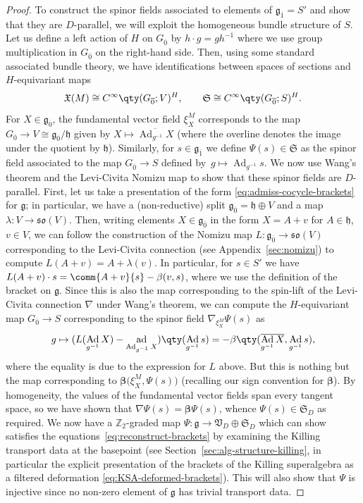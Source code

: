\documentclass[pdftex]{sigma}
\numberwithin{equation}{section}
\newcommand{\fg}{\mathfrak{g}}
\newcommand{\fh}{\mathfrak{h}}
\newcommand{\fso}{\mathfrak{so}}
\newcommand{\fX}{\mathfrak{X}}
\newcommand{\fS}{\mathfrak{S}}
\newcommand{\fV}{\mathfrak{V}}
\newcommand{\ZZ}{\mathbb{Z}}
\newcommand{\1}{\mathbbm{1}}
\DeclareMathOperator{\Ad}{Ad}
\DeclareMathOperator{\ad}{ad}
\begin{document}
\begin{proof}
	To construct the spinor fields associated to elements of $\fg_{\overline 1}=S'$ and show that they are $D$-parallel, we will exploit the homogeneous bundle structure of $S$. Let us define a left action of $H$ on $G_{\overline 0}$ by $h\cdot g=gh^{-1}$ where we use group multiplication in $G_{\overline 0}$ on the right-hand side. Then, using some standard associated bundle theory, we have identifications between spaces of sections and $H$-equivariant maps
	\[
		\fX(M) \cong C^\infty\qty(G_{\overline 0};V)^H,\qquad
		\fS \cong C^\infty\qty(G_{\overline 0};S)^H.
	\]
	For $X\in\fg_{\overline 0}$, the fundamental vector field $\xi^M_X$ corresponds to the map $G_{\overline 0}\to V\cong\fg_{\overline 0}/\fh$ given by $X\mapsto \overline{\Ad_{g^{-1}}X}$ (where the overline denotes the image under the quotient by $\fh$). Similarly, for $s\in \fg_{\overline 1}$ we define $\Psi(s)\in\fS$ as the spinor field associated to the map $G_{\overline 0}\to S$ defined by~${g\mapsto \Ad_{g^{-1}}s}$. We now use Wang's theorem and the Levi-Civita Nomizu map to show that these spinor fields are $D$-parallel. First, let us take a presentation of the form \eqref{eq:admiss-cocycle-brackets} for $\fg$; in particular, we have a (non-reductive) split $\fg_{\overline0}=\fh\oplus V$ and a map $\lambda\colon V\to\fso(V)$. Then, writing elements $X\in\fg_{\overline 0}$ in the form $X=A+v$ for $A\in\fh$, $v\in V$, we can follow the construction of the Nomizu map $L\colon \fg_{\overline 0}\to\fso(V)$ corresponding to the Levi-Civita connection (see Appendix~\ref{sec:nomizu}) to compute
$L(A+v) = A + \lambda(v)$.
	In particular, for $s\in S'$ we have $L(A+v)\cdot s = \comm{A+v}{s} - \beta(v,s)$, where we use the definition of the bracket on $\fg$. Since this is also the map corresponding to the spin-lift of the Levi-Civita connection $\nabla$ under Wang's theorem, we can compute the $H$-equivariant map $G_{\overline 0}\to S$ corresponding to the spinor field $\nabla_{\xi^M_X}\Psi(s)$ as
	\[
		g \mapsto (L(\Ad_{g^{-1}}X) - \ad_{\Ad_{g^{-1}}X})\qty(\Ad_{g^{-1}}s) = - \beta\qty(\overline{\Ad_{g^{-1}}X},\Ad_{g^{-1}}s),
	\]
	where the equality is due to the expression for $L$ above. But this is nothing but the map corresponding to $\boldsymbol{\beta}\bigl(\xi^M_X,\Psi(s)\bigr)$ (recalling our sign convention for $\boldsymbol{\beta}$). By homogeneity, the values of the fundamental vector fields span every tangent space, so we have shown that $\nabla\Psi(s)=\boldsymbol{\beta}\Psi(s)$, whence $\Psi(s)\in\fS_D$ as required. We now have a $\ZZ_2$-graded map $\Psi\colon\fg\to\fV_D\oplus\fS_D$ which can show satisfies the equations~\eqref{eq:reconstruct-brackets} by examining the Killing transport data at the basepoint (see Section~\ref{sec:alg-structure-killing}, in particular the explicit presentation of the brackets of the Killing superalgebra as a filtered deformation \eqref{eq:KSA-deformed-brackets}). This will also show that $\Psi$ is injective since no non-zero element of $\fg$ has trivial transport data.
	

\end{proof}
\end{document}

